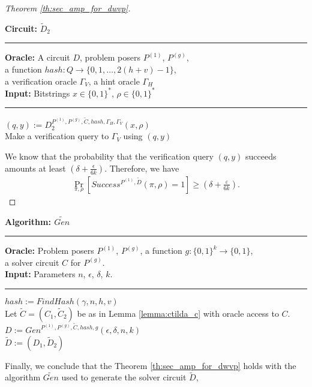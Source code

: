 \begin{proof}[Theorem \ref{th:sec_amp_for_dwvp}]
\begin{codeblock}
  \textbf{Circuit:} $\widetilde{D}_2$
  \medskip
  \hrule
  \medskip
  \textbf{Oracle:} A circuit $D$, problem posers $P^{(1)}$, $P^{(g)}$, \\
  \IndII a function $hash: Q \rightarrow \{0,1, \dots, 2(h+v) - 1\}$, \\
  \IndII a verification oracle $\Gamma_V$, a hint oracle $\Gamma_H$\\
  \textbf{Input:}  Bitstrings $x \in \{0,1\}^{*}$, $\rho \in \{0,1\}^{*}$
  \medskip\hrule\medskip
  $(q, y) := D_2^{P^{(1)}, P^{(g)}, \widetilde{C}, hash, \Gamma_H, \Gamma_V}(x, \rho)$ \\
  Make a verification query to $\Gamma_V$ using $(q,y)$
\end{codeblock}
We know that the probability that the verification query $(q,y)$ succeeds
amounts at least $(\delta + \frac{\epsilon}{6k})$.
Therefore, we have
\begin{align*}
    \underset{\pi, \rho}{\Pr}\left[Success^{P^{(1)},\widetilde{D}}(\pi, \rho) = 1\right] \geq (\delta + \frac{\varepsilon}{6k}).
\end{align*}
\end{proof}
%
\begin{codeblock}
  \textbf{Algorithm: $\widetilde{Gen}$}
  \medskip \hrule \medskip
  \textbf{Oracle:} Problem posers $P^{(1)}$, $P^{(g)}$, a function $g: \{0,1\}^{k} \rightarrow \{0,1\}$, \\
  \IndII a solver circuit $C$ for $P^{(g)}$.  \\
  \textbf{Input:} Parameters $n$, $\epsilon$, $\delta$, $k$.
  \medskip\hrule\medskip
  $hash := FindHash(\gamma, n, h, v)$ \\
  Let $\widetilde{C} = (C_1, \widetilde{C}_2)$ be as in Lemma \ref{lemma:ctilda_c} with oracle access to $C$. \\
  $D := Gen^{P^{(1)}, P^{(g)}, \widetilde{C}, hash, g}(\epsilon, \delta, n, k)$ \\
  \Return $\widetilde{D} := (D_1, \widetilde{D}_2)$
\end{codeblock}

Finally, we conclude that the Theorem \ref{th:sec_amp_for_dwvp} holds with the algorithm $\widetilde{Gen}$ used to generate the solver circuit $\widetilde{D}$,

